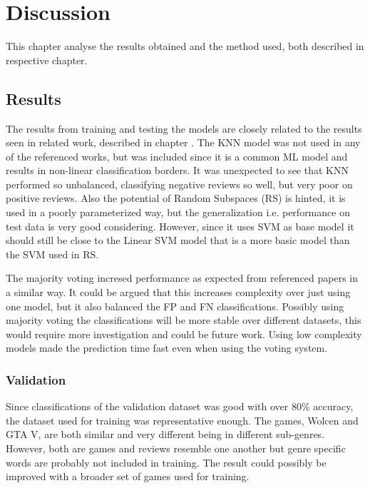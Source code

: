 \chapter{Discussion}
\label{cha:discussion}


This chapter analyse the results obtained and the method used, both described in respective chapter.


\section{Results}
\label{sec:discussion-results}


The results from training and testing the models are closely related to the results seen in related work, described in chapter . 
The KNN model was not used in any of the referenced works, but was included since it is a common ML model and results in non-linear classification borders. 
It was unexpected to see that KNN performed so unbalanced, classifying negative reviews so well, but very poor on positive reviews. 
Also the potential of Random Subspaces (RS) is hinted, it is used in a poorly parameterized way, but the generalization i.e. performance on test data is very good considering. 
However, since it uses SVM as base model it should still be close to the Linear SVM model that is a more basic model than the SVM used in RS. 


The majority voting incresed performance as expected from referenced papers in a similar way. 
It could be argued that this increases complexity over just using one model, but it also balanced the FP and FN classifications. 
Possibly using majority voting the classifications will be more stable over different datasets, this would require more investigation and could be future work. 
Using low complexity models made the prediction time fast even when using the voting system.


\subsection{Validation}
\label{sec:discussion-validation}


Since classifications of the validation dataset was good with over 80\% accuracy, the dataset used for training was representative enough. 
The games, Wolcen and GTA V, are both similar and very different being in different sub-genres. 
However, both are games and reviews resemble one another but genre specific words are probably not included in training. 
The result could possibly be improved with a broader set of games used for training. 


